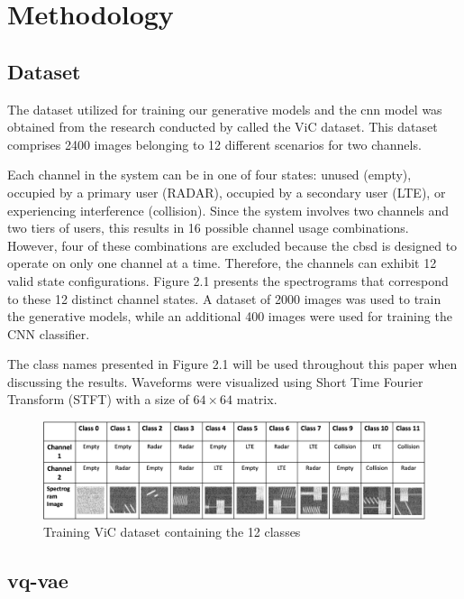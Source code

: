 \chapter{Methodology}
\label{chap:methods}

\section{Dataset}

The dataset utilized for training our generative models and the \gls{cnn} model was obtained from the research conducted by \cite{5} called the ViC dataset. This dataset comprises 2400 images belonging to 12 different scenarios for two channels. 

Each channel in the system can be in one of four states: unused (empty), occupied by a primary user (RADAR), occupied by a secondary user (LTE), or experiencing interference (collision). Since the system involves two channels and two tiers of users, this results in 16 possible channel usage combinations. However, four of these combinations are excluded because the \gls{cbsd} is designed to operate on only one channel at a time. Therefore, the channels can exhibit 12 valid state configurations. Figure 2.1 presents the spectrograms that correspond to these 12 distinct channel states. A dataset of 2000 images was used to train the generative models, while an additional 400 images were used for training the CNN classifier.

The class names presented in Figure 2.1 will be used throughout this paper when discussing the results. Waveforms were visualized using  Short Time Fourier Transform (STFT) with a size of $64 \times 64 $ matrix.

\begin{figure}[h]
\includegraphics[width=\textwidth]{figures/classes_white_background.png}
\centering
\caption{Training ViC dataset containing the 12 classes \cite{5}}
\label{fig:training-dataset}
\centering
\end{figure}
\section{\gls{vq-vae}}

